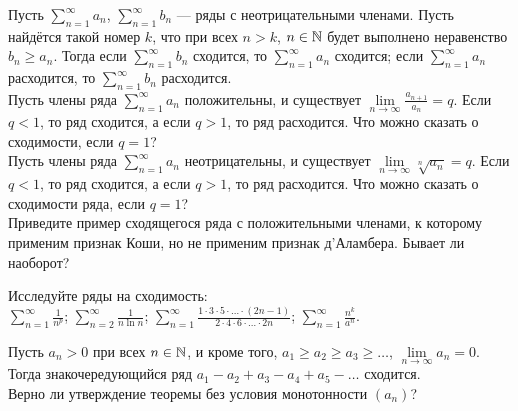 \documentclass[a4paper,11pt]{article}
\begin{document}




Пусть $\sum\limits_{n=1}^\infty a_n$, $\sum\limits_{n=1}^\infty b_n$ --- ряды с неотрицательными членами.
Пусть найдётся такой номер $k$, что при всех $n>k$, $n\in\mathbb{N}$
будет выполнено неравенство $b_n\geqslant a_n$. Тогда если $\sum\limits_{n=1}^\infty b_n$ сходится, то
$\sum\limits_{n=1}^\infty a_n$ сходится; если $\sum\limits_{n=1}^\infty a_n$ расходится, то
$\sum\limits_{n=1}^\infty b_n$ расходится.
\\
Пусть члены ряда $\sum\limits_{n=1}^\infty a_n$
положительны, и
существует %
$\lim\limits_{n\to\infty}\frac{a_{n+1}}{a_n}=q$.
Если $q<1$, то
ряд сходится, а если %
$q>1$, то ряд расходится. Что можно сказать о сходимости, если $q=1$?
\\
Пусть члены ряда $\sum\limits_{n=1}^\infty a_n$ неотрицательны,
и существует %
$\lim\limits_{n\to\infty}\sqrt[n]{a_n}=q$.
Если $q<1$, то
ряд сходится, а если
$q>1$, то ряд расходится. Что можно сказать о сходимости ряда,
если $q=1$?
\\
Приведите пример сходящегося ряда
с положительными членами, к которому применим признак Коши,
но не применим признак д'Аламбера. Бывает ли наоборот?

Исследуйте ряды на сходимость:\\
$\sum\limits_{n=1}^\infty \frac1{n^p}$;
$\sum\limits_{n=2}^\infty \frac1{n\ln n}$;
$\sum\limits_{n=1}^\infty \frac{1\cdot3\cdot5\cdot\ldots\cdot(2n-1)}
{2\cdot4\cdot6\cdot\ldots\cdot2n}$;
$\sum\limits_{n=1}^\infty \frac{n^k}{a^n}$.


Пусть $a_n>0$ при всех $n\in\mathbb{N}$, и кроме того, $a_1\geqslant a_2\geqslant
a_3\geqslant\dots$, $\lim\limits_{n\to\infty}a_n=0$.
Тогда знакочередующийся ряд $a_1-a_2+a_3-a_4+a_5-\dots$ сходится.
\\
Верно ли утверждение теоремы без условия монотонности $(a_n)$?

\end{document}
